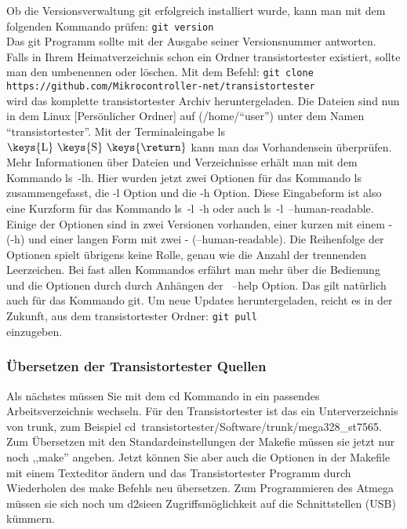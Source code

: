 Ob die Versionsverwaltung git erfolgreich installiert wurde,
kann man mit dem folgenden Kommando prüfen:
\verb"git version"\\
Das git Programm sollte mit der Ausgabe seiner Versionsnummer antworten.
Falls in Ihrem Heimatverzeichnis schon ein Ordner transistortester existiert,
sollte man den umbenennen oder löschen.
Mit dem Befehl:   
\verb"git clone https://github.com/Mikrocontroller-net/transistortester"\\
wird das komplette transistortester Archiv heruntergeladen.
Die Dateien sind nun in dem Linux [Persönlicher Ordner] auf (/home/"`user"') unter dem
Namen "`transistortester"'.
Mit der Terminaleingabe  ls \(\mbox{\keys{L} \keys{S} \keys{\return}}\) kann man das Vorhandensein überprüfen.
Mehr Informationen über Dateien und Verzeichnisse erhält man mit
dem Kommando \mbox{ls -lh}. Hier wurden jetzt zwei Optionen für das Kommando ls zusammengefasst,
die -l Option und die -h Option. Diese Eingabeform ist also eine Kurzform für
das Kommando \mbox{ls -l -h} oder auch \mbox{ls -l --human-readable}.
Einige der Optionen sind in zwei Versionen vorhanden, einer kurzen mit einem - (-h)
und einer langen Form mit zwei - (--human-readable).
Die Reihenfolge der Optionen spielt übrigens keine Rolle,
genau wie die Anzahl der trennenden Leerzeichen.
Bei fast allen Kommandos erfährt man mehr über die Bedienung und die Optionen
durch durch Anhängen der \mbox{ --help} Option.
Das gilt natürlich auch für das Kommando git.
Um neue Updates heruntergeladen, reicht es in der Zukunft, aus dem transistortester Ordner:
\verb"git pull"\\
einzugeben.

\subsubsection{Übersetzen der Transistortester Quellen}

Als nächstes müssen Sie mit dem cd Kommando in ein passendes Arbeitsverzeichnis wechseln.
Für den Transistortester ist das ein Unterverzeichnis von trunk, zum Beispiel
\mbox{cd transistortester/Software/trunk/mega328\_st7565}.
Zum Übersetzen mit den Standardeinstellungen der Makefie müssen sie jetzt nur noch ,,make'' angeben.
Jetzt können Sie aber auch die Optionen in der Makefile mit einem Texteditor ändern
und das Transistortester Programm durch Wiederholen des make Befehls neu übersetzen.
Zum Programmieren des Atmega müssen sie sich noch um d2sieen Zugriffsmöglichkeit auf die
Schnittstellen (USB) kümmern.

